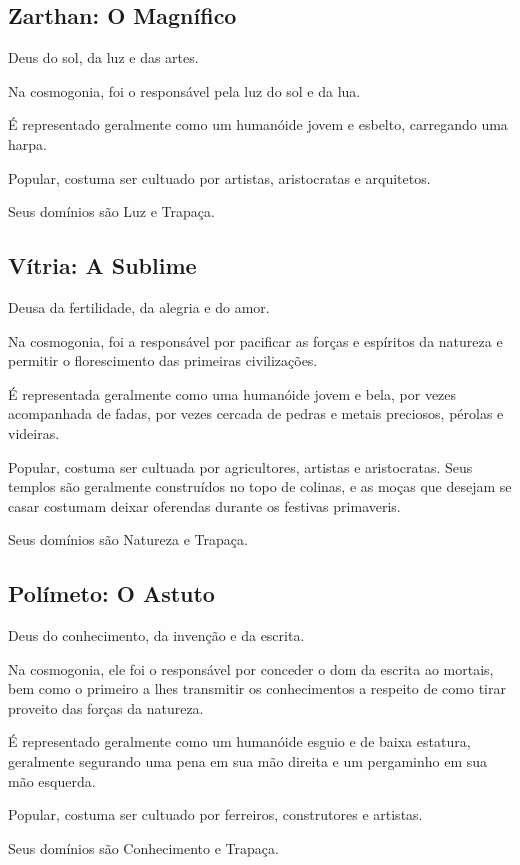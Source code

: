\documentclass[letterpaper,twocolumn,openany]{dndbook}
\begin{document}
	\subsection{Zarthan: O Magnífico}
	Deus do sol, da luz e das artes.
	\par Na cosmogonia, foi o responsável pela luz do sol e da lua.
	\par É representado geralmente como um humanóide jovem e esbelto, carregando uma harpa.
	\par Popular, costuma ser cultuado por artistas, aristocratas e arquitetos.
	\par Seus domínios são Luz e Trapaça.
	
	\subsection{Vítria: A Sublime}
	Deusa da fertilidade, da alegria e do amor.
	\par Na cosmogonia, foi a responsável por pacificar as forças e espíritos da natureza e permitir o florescimento das primeiras civilizações.
	\par É representada geralmente como uma humanóide jovem e bela, por vezes acompanhada de fadas, por vezes cercada de pedras e metais preciosos, pérolas e videiras.
	\par Popular, costuma ser cultuada por agricultores, artistas e aristocratas. Seus templos são geralmente construídos no topo de colinas, e as moças que desejam se casar costumam deixar oferendas durante os festivas primaveris.
	\par Seus domínios são Natureza e Trapaça.
	
	\subsection{Polímeto: O Astuto}
	Deus do conhecimento, da invenção e da escrita.
	\par Na cosmogonia, ele foi o responsável por conceder o dom da escrita ao mortais, bem como o primeiro a lhes transmitir os conhecimentos a respeito de como tirar proveito das forças da natureza.
	\par É representado geralmente como um humanóide esguio e de baixa estatura, geralmente segurando uma pena em sua mão direita e um pergaminho em sua mão esquerda.
	\par Popular, costuma ser cultuado por ferreiros, construtores e artistas.
	\par Seus domínios são Conhecimento e Trapaça.
	
\end{document}
